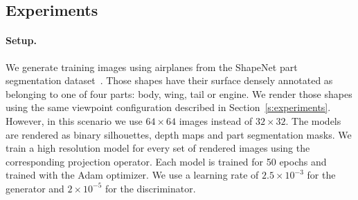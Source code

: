 \subsection{Experiments}

\paragraph*{Setup.}
We generate training images using airplanes from the ShapeNet part segmentation dataset~\cite{chang2015shapenet}.
Those shapes have their surface densely annotated as belonging to one of four parts:
body, wing, tail or engine.
We render those shapes using the same viewpoint configuration described in Section~\ref{s:experiments}.
However, in this scenario we use $64\times 64$ images instead of $32\times 32$.
The models are rendered as binary silhouettes, depth maps and part segmentation masks.
We train a high resolution \prgan model for every set of rendered images using the corresponding
projection operator.
Each model is trained for 50 epochs and trained with the Adam optimizer.
We use a learning rate of $2.5 \times 10^{-3}$ for the generator and
$2 \times 10^{-5}$ for the discriminator.

